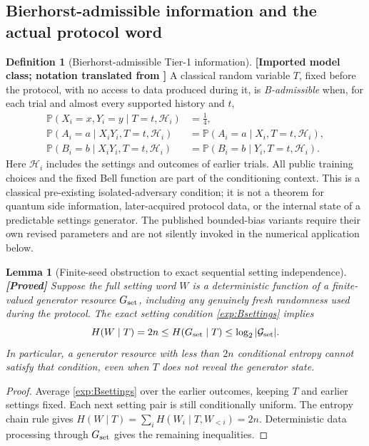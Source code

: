\documentclass[11pt,a4paper]{article}
\newtheorem{lemma}[theorem]{Lemma}
\theoremstyle{definition}
\newtheorem{definition}[theorem]{Definition}
\theoremstyle{remark}\newtheorem{remark}[theorem]{Remark}
\newcommand{\status}[1]{\textbf{[#1]}\quad}
\newcommand{\Prb}{\mathbb P}
\begin{document}
\subsection{Bierhorst-admissible information and the actual protocol word}
\begin{definition}[Bierhorst-admissible Tier-1 information]\label{exp:admissible}
\status{Imported model class; notation translated from \cite[Eqs.~(2)--(3)]{Bierhorst18}}
A classical random variable $T$, fixed before the protocol, with no access to data produced during it, is \emph{B-admissible} when, for each trial and almost every supported history and $t$,
\begin{align}
 \Prb(X_i=x,Y_i=y\mid T=t,\mathcal H_i)&=\tfrac14,\label{exp:Bsettings}\\
 \Prb(A_i=a\mid X_iY_i,T=t,\mathcal H_i)
 &=\Prb(A_i=a\mid X_i,T=t,\mathcal H_i),\label{exp:BNSa}\\
 \Prb(B_i=b\mid X_iY_i,T=t,\mathcal H_i)
 &=\Prb(B_i=b\mid Y_i,T=t,\mathcal H_i).\label{exp:BNSb}
\end{align}
Here $\mathcal H_i$ includes the settings and outcomes of earlier trials. All public training choices and the fixed Bell function are part of the conditioning context. This is a classical pre-existing isolated-adversary condition; it is not a theorem for quantum side information, later-acquired protocol data, or the internal state of a predictable settings generator. The published bounded-bias variants require their own revised parameters and are not silently invoked in the numerical application below.
\end{definition}

\begin{lemma}[Finite-seed obstruction to exact sequential setting independence]\label{exp:seednecessity}
\status{Proved}
Suppose the full setting word $W$ is a deterministic function of a finite-valued generator resource $G_{\rm set}$, including any genuinely fresh randomness used during the protocol. The exact setting condition \eqref{exp:Bsettings} implies
\[
 H(W\mid T)=2n\le H(G_{\rm set}\mid T)\le\log_2|\mathcal G_{\rm set}|.
\]
In particular, a generator resource with less than $2n$ conditional entropy cannot satisfy that condition, even when $T$ does not reveal the generator state.
\end{lemma}
\begin{proof}
Average \eqref{exp:Bsettings} over the earlier outcomes, keeping $T$ and earlier settings fixed. Each next setting pair is still conditionally uniform. The entropy chain rule gives $H(W\mid T)=\sum_i H(W_i\mid T,W_{<i})=2n$. Deterministic data processing through $G_{\rm set}$ gives the remaining inequalities.
\end{proof}
\end{document}
